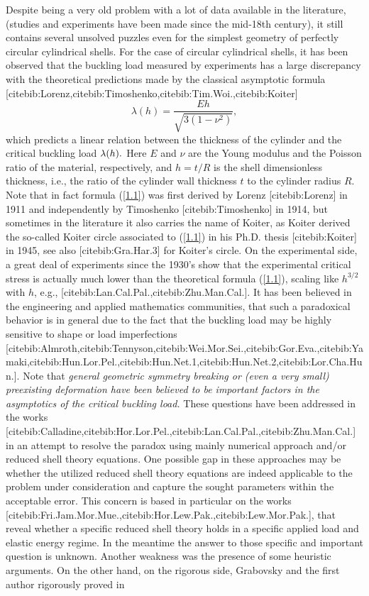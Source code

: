Despite being a very old problem with a lot of data available in the literature, (studies and experiments have been made since the mid-18th century), it still contains several unsolved puzzles even for the simplest geometry of perfectly circular cylindrical shells. For the case of circular cylindrical shells, it has been observed that the buckling load measured by experiments has a large discrepancy with the theoretical predictions made by the classical asymptotic formula 
[cite{bib:Lorenz},cite{bib:Timoshenko},cite{bib:Tim.Woi.},cite{bib:Koiter}]
\begin{equation}
\label{1.1}
\lambda(h)=\frac{E h}{\sqrt{3\left(1-\nu^{2}\right)}},
\end{equation}
which predicts a linear relation between the thickness of the cylinder and the critical buckling load $\lambda(h).$ Here $E$ and $\nu$ are the Young modulus and the Poisson ratio of the material, respectively, and $h=t/R$ is the shell dimensionless thickness, i.e., the ratio of the cylinder wall thickness $t$ to the cylinder radius $R$.  Note that in fact formula (\ref{1.1}) was first derived by Lorenz [cite{bib:Lorenz}] in 1911 and independently by Timoshenko [cite{bib:Timoshenko}] in 1914, but  sometimes in the literature it also carries the name of Koiter, as Koiter derived the so-called Koiter circle associated to (\ref{1.1}) in his Ph.D. thesis [cite{bib:Koiter}] in 1945, see also [cite{bib:Gra.Har.3}] for Koiter's circle. On the experimental side, a great deal of experiments since the 1930's show that the experimental critical stress is actually much lower than the theoretical formula (\ref{1.1}), scaling like $h^{3/2}$ with $h$, e.g., [cite{bib:Lan.Cal.Pal.},cite{bib:Zhu.Man.Cal.}]. It has been believed in the engineering and applied mathematics communities, that such a paradoxical behavior is in general due to the fact that the buckling load may be highly sensitive to shape or load imperfections [cite{bib:Almroth},cite{bib:Tennyson},cite{bib:Wei.Mor.Sei.},cite{bib:Gor.Eva.},cite{bib:Yamaki},cite{bib:Hun.Lor.Pel.},cite{bib:Hun.Net.1},cite{bib:Hun.Net.2},cite{bib:Lor.Cha.Hun.}]. Note that \textit{general geometric symmetry breaking or (even a very small) preexisting deformation have been believed to be important factors in the asymptotics of the critical buckling load.} These questions have been addressed in the works [cite{bib:Calladine},cite{bib:Hor.Lor.Pel.},cite{bib:Lan.Cal.Pal.},cite{bib:Zhu.Man.Cal.}] in an attempt to resolve the paradox using mainly numerical approach and/or reduced shell theory equations. One possible gap in these approaches may be whether the utilized reduced shell theory equations are indeed applicable to the problem under consideration and capture the sought parameters within the acceptable error. This concern is based in particular on the works [cite{bib:Fri.Jam.Mor.Mue.},cite{bib:Hor.Lew.Pak.},cite{bib:Lew.Mor.Pak.}], that reveal whether a specific reduced shell theory holds in a specific applied load and elastic energy regime. In the meantime the answer to those specific and important question is unknown. Another weakness was the presence of some heuristic arguments. On the other hand, on the rigorous side, Grabovsky and the first author rigorously proved in 